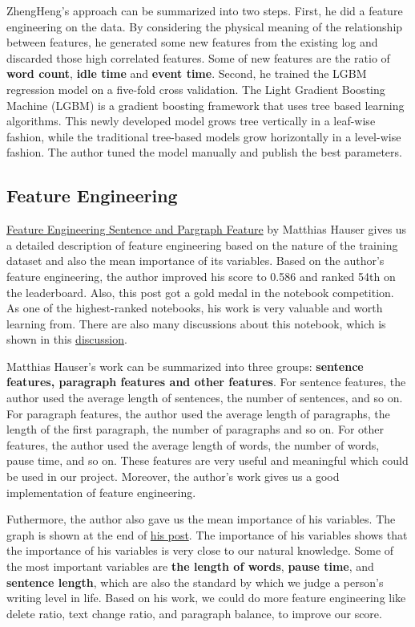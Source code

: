 \documentclass[8pt]{report}
\begin{document}
ZhengHeng's approach can be summarized into two steps. First, he did a feature engineering on the data. 
By considering the physical meaning of the relationship between features, he generated some new features from 
the existing log and discarded those high correlated features. Some of new features are the ratio of 
\textbf{word count}, \textbf{idle time} and \textbf{event time}. Second, he trained the LGBM regression model
on a five-fold cross validation. The Light Gradient Boosting Machine (LGBM) is a gradient boosting framework
that uses tree based learning algorithms. 
This newly developed model grows tree vertically in a leaf-wise fashion, while the traditional tree-based models
grow horizontally in a level-wise fashion. The author tuned the model manually and publish the best parameters. 

\subsection{Feature Engineering}
\href{https://www.kaggle.com/code/hiarsl/feature-engineering-sentence-paragraph-features}{Feature Engineering Sentence and Pargraph Feature} by Matthias Hauser
gives us a detailed description of feature engineering based on the nature of the training dataset and also the mean importance of its variables. Based on the author's feature engineering,
the author improved his score to 0.586 and ranked 54th on the leaderboard. Also, this post got a gold medal in the notebook competition. As one of the highest-ranked notebooks, 
his work is very valuable and worth learning from. There are also many discussions about this notebook, which is shown in this \href{https://www.kaggle.com/code/hiarsl/feature-engineering-sentence-paragraph-features/comments}{discussion}.

Matthias Hauser's work can be summarized into three groups: \textbf{sentence features, paragraph features and other features}. 
For sentence features, the author used the average length of sentences, the number of sentences, and so on. 
For paragraph features, the author used the average length of paragraphs, the length of the first paragraph, the number of paragraphs and so on.
For other features, the author used the average length of words, the number of words, pause time, and so on.
These features are very useful and meaningful which could be used in our project. Moreover, the author's work gives us a good implementation of feature engineering.

Futhermore, the author also gave us the mean importance of his variables. The graph is shown at the end of \href{https://www.kaggle.com/code/hiarsl/feature-engineering-sentence-paragraph-features/notebook}{his post}.
The importance of his variables shows that the importance of his variables is very close to our natural knowledge. Some of the most important variables are \textbf{the length of words}, \textbf{pause time}, and \textbf{sentence length}, which are also the standard by which we judge a person’s writing level in life.
Based on his work, we could do more feature engineering like delete ratio, text change ratio, and paragraph balance, to improve our score.
\end{document}
